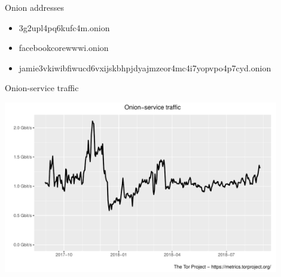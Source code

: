 \documentclass[aspectratio=169,10pt]{beamer}
\begin{document}
  
  \begin{frame}[fragile]{Onion addresses}
    
    \begin{itemize}
      \item 3g2upl4pq6kufc4m.onion
      \item \alert{facebook}corewwwi.onion
      \item \alert{jamie}3vkiwibfiwucd6vxijskbhpjdyajmzeor4mc4i7yopvpo4p7cyd.onion
    \end{itemize}
  \end{frame}
  
  
  \begin{frame}[fragile]{Onion-service traffic}
    \begin{center}
      \href{https://metrics.torproject.org/hidserv-rend-relayed-cells.html}{\includegraphics[width=0.9\textwidth]{img/onionservice.pdf}}
    \end{center}
  \end{frame}
  
\end{document}
